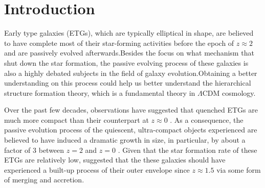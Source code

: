 \documentclass[fleqn,usenatbib]{mnras}
\begin{document}
\section{Introduction}
\label{sec:intro}
\par Early type galaxies (ETGs), which are typically elliptical in shape, are believed to have complete most of their star-forming activities before the epoch of $z \approx 2$ and are passively evolved afterwards.Besides the focus on what mechanism that shut down the star formation, the passive evolving process of these galaxies is also a highly debated subjects in the field of galaxy evolution.Obtaining a better understanding on this process could help us better understand the hierarchical structure formation theory, which is a fundamental theory in $\Lambda$CDM cosmology.
\par  Over the past few decades, observations have suggested that quenched ETGs are much more compact than their counterpart at $z \approx 0$ \citep{daddiPassivelyEvolvingEarlyType2005, toft2007, trujillo2006, trujillo2007, vandokkum2008}. As a consequence, the passive evolution process of the quiescent, ultra-compact objects experienced are believed to have induced a dramatic growth in size, in particular, by about a factor of 3 between $z = 2$ and $z = 0$ \citep{damjanov2019, fan_dramatic_2008, hamadouche2022, vanderwel3DHSTCANDELSEvolution2014, van_dokkum_growth_2010}.
Given that the star formation rate of these ETGs are relatively low, \cite{van_dokkum_growth_2010} suggested that the these galaxies should have experienced a built-up process of their outer envelope since $z \approx 1.5$ via some form of merging and accretion.
\end{document}
